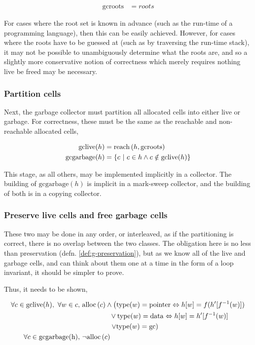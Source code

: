 \begin{align*}
  \mathrm{gcroots} &= roots
\end{align*}

For cases where the root set is known in advance (such as the run-time
of a programming language), then this can be easily achieved. However,
for cases where the roots have to be guessed at (such as by traversing
the run-time stack), it may not be possible to unambiguously determine
what the roots are, and so a slightly more conservative notion of
correctness which merely requires nothing live be freed may be
necessary.

\subsubsection{Partition cells}
\label{sec:gc-framework-obligations-partition}

Next, the garbage collector must partition all allocated cells into
either live or garbage. For correctness, these must be the same as the
reachable and non-reachable allocated cells,

\begin{align*}
  \mathrm{gclive}(h) &= \mathrm{reach}\left(h, \mathrm{gcroots}\right)\\
  \mathrm{gcgarbage}(h) &= \left\{c~|~c \in h \land c \notin
    \mathrm{gclive}(h)\right\}
\end{align*}

This stage, as all others, may be implemented implicitly in a
collector. The building of $\mathrm{gcgarbage}(h)$ is implicit in a
mark-sweep collector, and the building of both is in a copying
collector.

\subsubsection{Preserve live cells and free garbage cells}
\label{sec:gc-framework-obligations-collect}

These two may be done in any order, or interleaved, as if the
partitioning is correct, there is no overlap between the two
classes. The obligation here is no less than preservation
(defn. \ref{def:g-preservation}), but as we know all of the live and
garbage cells, and can think about them one at a time in the form of a
loop invariant, it should be simpler to prove.

Thus, it needs to be shown,

\begin{align*}
  \forall c \in \mathrm{gclive}(h),\ \forall w \in c,\ & \mathrm{alloc}\left(c\right) \land 
  \left(\mathrm{type}(w) = \mathrm{pointer} \Leftrightarrow h[w] =
    f(h'[f^{-1}(w)])\right.\\
  &\quad\quad\quad\quad \lor \mathrm{type}(w) = \mathrm{data}
  \Leftrightarrow h[w] = h'[f^{-1}(w)]\\
  &\quad\quad\quad\quad \left.\lor \mathrm{type}(w) =
    \mathrm{gc}\right)\\
  \forall c \in \mathrm{gcgarbage(h)},\ & \lnot \mathrm{alloc}\left(c\right)
\end{align*}

